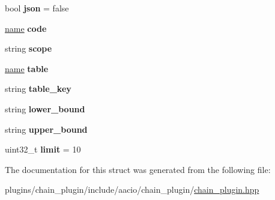 \begin{DoxyCompactItemize}
\item 
\mbox{\label{structaacio_1_1chain__apis_1_1read__only_1_1get__table__rows__params_a138b170ddd582748380a3d72ccb909b7}} 
bool {\bfseries json} = false
\item 
\mbox{\label{structaacio_1_1chain__apis_1_1read__only_1_1get__table__rows__params_ad02c6acfbdbaa84cab876a03cc2807db}} 
\mbox{\hyperlink{structaacio_1_1name}{name}} {\bfseries code}
\item 
\mbox{\label{structaacio_1_1chain__apis_1_1read__only_1_1get__table__rows__params_a87599993fef43ed9c9ba45d7d3c16bcc}} 
string {\bfseries scope}
\item 
\mbox{\label{structaacio_1_1chain__apis_1_1read__only_1_1get__table__rows__params_a94b27842ddd2e4453c176b9c6b2cb490}} 
\mbox{\hyperlink{structaacio_1_1name}{name}} {\bfseries table}
\item 
\mbox{\label{structaacio_1_1chain__apis_1_1read__only_1_1get__table__rows__params_ae7cdfbdc659ad03be6b7e62ff4c63cd1}} 
string {\bfseries table\+\_\+key}
\item 
\mbox{\label{structaacio_1_1chain__apis_1_1read__only_1_1get__table__rows__params_a9bb9e95301a4eb39aa8782097441c336}} 
string {\bfseries lower\+\_\+bound}
\item 
\mbox{\label{structaacio_1_1chain__apis_1_1read__only_1_1get__table__rows__params_a3779626b098f6eae5988bd8ba045ad2f}} 
string {\bfseries upper\+\_\+bound}
\item 
\mbox{\label{structaacio_1_1chain__apis_1_1read__only_1_1get__table__rows__params_acb0c74c8df6a6c08e7f3fcaf423f7aed}} 
uint32\+\_\+t {\bfseries limit} = 10
\end{DoxyCompactItemize}


The documentation for this struct was generated from the following file\+:\begin{DoxyCompactItemize}
\item 
plugins/chain\+\_\+plugin/include/aacio/chain\+\_\+plugin/\mbox{\hyperlink{chain__plugin_8hpp}{chain\+\_\+plugin.\+hpp}}\end{DoxyCompactItemize}
